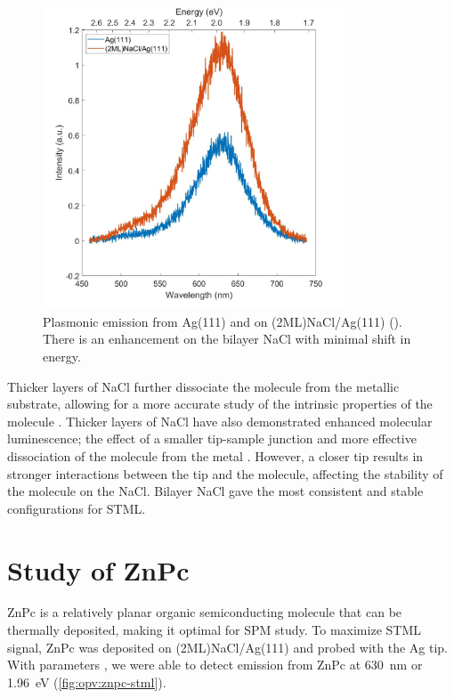 \begin{figure} [h]
    \centering
    \includegraphics[width=0.8\textwidth]{pictures/NaCl_enhancement_Ag111_275V_250pA_10s.jpg}
    \caption{Plasmonic emission from Ag(111) and on (2ML)NaCl/Ag(111) (). There is an enhancement on the bilayer NaCl with minimal shift in energy. }
    \label{fig:opv:nacl-plasmon}
\end{figure}

Thicker layers of NaCl further dissociate the molecule from the metallic substrate, allowing for a more accurate study of the intrinsic properties of the molecule \citep{repp2005molecules}. Thicker layers of NaCl have also demonstrated enhanced molecular luminescence; the effect of a smaller tip-sample junction and more effective dissociation of the molecule from the metal \citep{Zhang2017,Kroger2018}. However, a closer tip results in stronger interactions between the tip and the molecule, affecting the stability of the molecule on the NaCl. Bilayer NaCl gave the most consistent and stable configurations for \ac{STML}.



\section{Study of {ZnPc}}

\ac{ZnPc} is a relatively planar organic semiconducting molecule that can be thermally deposited, making it optimal for \ac{SPM} study. To maximize \ac{STML} signal, ZnPc was deposited on (2ML)NaCl/Ag(111) and probed with the Ag tip. With parameters , we were able to detect emission from ZnPc at \SI{630}{nm} or \SI{1.96}{eV} (\autoref{fig:opv:znpc-stml}).

